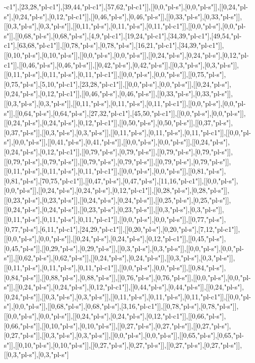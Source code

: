 -c1"],[23,28,"pl-c1"],[39,44,"pl-c1"],[57,62,"pl-c1"]],[[0,0,"pl-s"],[0,0,"pl-s"]],[[0,24,"pl-s"],[0,24,"pl-s"],[0,12,"pl-c1"]],[[0,46,"pl-s"],[0,46,"pl-s"]],[[0,33,"pl-s"],[0,33,"pl-s"]],[[0,3,"pl-s"],[0,3,"pl-s"]],[[0,11,"pl-s"],[0,11,"pl-s"],[0,11,"pl-c1"]],[[0,0,"pl-s"],[0,0,"pl-s"]],[[0,68,"pl-s"],[0,68,"pl-s"],[4,9,"pl-c1"],[19,24,"pl-c1"],[34,39,"pl-c1"],[49,54,"pl-c1"],[63,68,"pl-c1"]],[[0,78,"pl-s"],[0,78,"pl-s"],[16,21,"pl-c1"],[34,39,"pl-c1"]],[[0,10,"pl-s"],[0,10,"pl-s"]],[[0,0,"pl-s"],[0,0,"pl-s"]],[[0,24,"pl-s"],[0,24,"pl-s"],[0,12,"pl-c1"]],[[0,46,"pl-s"],[0,46,"pl-s"]],[[0,42,"pl-s"],[0,42,"pl-s"]],[[0,3,"pl-s"],[0,3,"pl-s"]],[[0,11,"pl-s"],[0,11,"pl-s"],[0,11,"pl-c1"]],[[0,0,"pl-s"],[0,0,"pl-s"]],[[0,75,"pl-s"],[0,75,"pl-s"],[5,10,"pl-c1"],[23,28,"pl-c1"]],[[0,0,"pl-s"],[0,0,"pl-s"]],[[0,24,"pl-s"],[0,24,"pl-s"],[0,12,"pl-c1"]],[[0,46,"pl-s"],[0,46,"pl-s"]],[[0,33,"pl-s"],[0,33,"pl-s"]],[[0,3,"pl-s"],[0,3,"pl-s"]],[[0,11,"pl-s"],[0,11,"pl-s"],[0,11,"pl-c1"]],[[0,0,"pl-s"],[0,0,"pl-s"]],[[0,64,"pl-s"],[0,64,"pl-s"],[27,32,"pl-c1"],[45,50,"pl-c1"]],[[0,0,"pl-s"],[0,0,"pl-s"]],[[0,24,"pl-s"],[0,24,"pl-s"],[0,12,"pl-c1"]],[[0,50,"pl-s"],[0,50,"pl-s"]],[[0,37,"pl-s"],[0,37,"pl-s"]],[[0,3,"pl-s"],[0,3,"pl-s"]],[[0,11,"pl-s"],[0,11,"pl-s"],[0,11,"pl-c1"]],[[0,0,"pl-s"],[0,0,"pl-s"]],[[0,41,"pl-s"],[0,41,"pl-s"]],[[0,0,"pl-s"],[0,0,"pl-s"]],[[0,24,"pl-s"],[0,24,"pl-s"],[0,12,"pl-c1"]],[[0,79,"pl-s"],[0,79,"pl-s"]],[[0,79,"pl-s"],[0,79,"pl-s"]],[[0,79,"pl-s"],[0,79,"pl-s"]],[[0,79,"pl-s"],[0,79,"pl-s"]],[[0,79,"pl-s"],[0,79,"pl-s"]],[[0,11,"pl-s"],[0,11,"pl-s"],[0,11,"pl-c1"]],[[0,0,"pl-s"],[0,0,"pl-s"]],[[0,81,"pl-s"],[0,81,"pl-s"],[70,75,"pl-c1"]],[[0,47,"pl-s"],[0,47,"pl-s"],[11,16,"pl-c1"]],[[0,0,"pl-s"],[0,0,"pl-s"]],[[0,24,"pl-s"],[0,24,"pl-s"],[0,12,"pl-c1"]],[[0,28,"pl-s"],[0,28,"pl-s"]],[[0,23,"pl-s"],[0,23,"pl-s"]],[[0,24,"pl-s"],[0,24,"pl-s"]],[[0,25,"pl-s"],[0,25,"pl-s"]],[[0,24,"pl-s"],[0,24,"pl-s"]],[[0,23,"pl-s"],[0,23,"pl-s"]],[[0,3,"pl-s"],[0,3,"pl-s"]],[[0,11,"pl-s"],[0,11,"pl-s"],[0,11,"pl-c1"]],[[0,0,"pl-s"],[0,0,"pl-s"]],[[0,77,"pl-s"],[0,77,"pl-s"],[6,11,"pl-c1"],[24,29,"pl-c1"]],[[0,20,"pl-s"],[0,20,"pl-s"],[7,12,"pl-c1"]],[[0,0,"pl-s"],[0,0,"pl-s"]],[[0,24,"pl-s"],[0,24,"pl-s"],[0,12,"pl-c1"]],[[0,45,"pl-s"],[0,45,"pl-s"]],[[0,29,"pl-s"],[0,29,"pl-s"]],[[0,3,"pl-s"],[0,3,"pl-s"]],[[0,0,"pl-s"],[0,0,"pl-s"]],[[0,62,"pl-s"],[0,62,"pl-s"]],[[0,24,"pl-s"],[0,24,"pl-s"]],[[0,3,"pl-s"],[0,3,"pl-s"]],[[0,11,"pl-s"],[0,11,"pl-s"],[0,11,"pl-c1"]],[[0,0,"pl-s"],[0,0,"pl-s"]],[[0,84,"pl-s"],[0,84,"pl-s"]],[[0,88,"pl-s"],[0,88,"pl-s"]],[[0,76,"pl-s"],[0,76,"pl-s"]],[[0,0,"pl-s"],[0,0,"pl-s"]],[[0,24,"pl-s"],[0,24,"pl-s"],[0,12,"pl-c1"]],[[0,44,"pl-s"],[0,44,"pl-s"]],[[0,24,"pl-s"],[0,24,"pl-s"]],[[0,3,"pl-s"],[0,3,"pl-s"]],[[0,11,"pl-s"],[0,11,"pl-s"],[0,11,"pl-c1"]],[[0,0,"pl-s"],[0,0,"pl-s"]],[[0,68,"pl-s"],[0,68,"pl-s"],[3,16,"pl-c1"]],[[0,78,"pl-s"],[0,78,"pl-s"]],[[0,0,"pl-s"],[0,0,"pl-s"]],[[0,24,"pl-s"],[0,24,"pl-s"],[0,12,"pl-c1"]],[[0,66,"pl-s"],[0,66,"pl-s"]],[[0,10,"pl-s"],[0,10,"pl-s"]],[[0,27,"pl-s"],[0,27,"pl-s"]],[[0,27,"pl-s"],[0,27,"pl-s"]],[[0,3,"pl-s"],[0,3,"pl-s"]],[[0,0,"pl-s"],[0,0,"pl-s"]],[[0,65,"pl-s"],[0,65,"pl-s"]],[[0,10,"pl-s"],[0,10,"pl-s"]],[[0,27,"pl-s"],[0,27,"pl-s"]],[[0,27,"pl-s"],[0,27,"pl-s"]],[[0,3,"pl-s"],[0,3,"pl-s"]